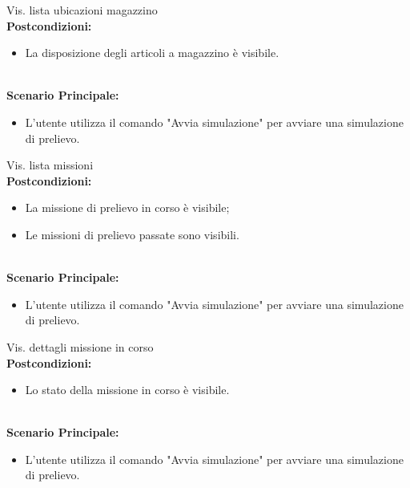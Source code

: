 \begin{usecase}{4}{Vis. lista ubicazioni magazzino}
\textbf{\\Postcondizioni:}
\begin{itemize}
    \item La disposizione degli articoli a magazzino è visibile.
\end{itemize}
\textbf{\\Scenario Principale:}
\begin{itemize}
    \item L'utente utilizza il comando "Avvia simulazione" per avviare una simulazione di prelievo.
\end{itemize}
\label{uc:scenario-principale}
\end{usecase}
\begin{usecase}{5}{Vis. lista missioni}
\textbf{\\Postcondizioni:}
\begin{itemize}
    \item La missione di prelievo in corso è visibile;
    \item Le missioni di prelievo passate sono visibili.
\end{itemize}
\textbf{\\Scenario Principale:}
\begin{itemize}
    \item L'utente utilizza il comando "Avvia simulazione" per avviare una simulazione di prelievo.
\end{itemize}
\label{uc:scenario-principale}
\end{usecase}
\begin{usecase}{6}{Vis. dettagli missione in corso}
\textbf{\\Postcondizioni:}
\begin{itemize}
    \item Lo stato della missione in corso è visibile.
\end{itemize}
\textbf{\\Scenario Principale:}
\begin{itemize}
    \item L'utente utilizza il comando "Avvia simulazione" per avviare una simulazione di prelievo.
\end{itemize}
\label{uc:scenario-principale}
\end{usecase}
